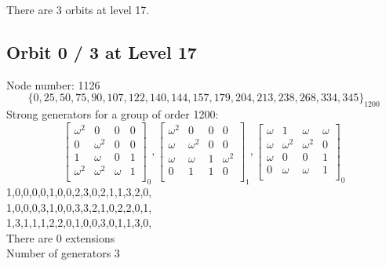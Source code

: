 There are 3 orbits at level 17.\\
\bigskip
\subsection*{Orbit 0 / 3 at Level 17}
Node number: 1126\\
$$
\{ 0, 25, 50, 75, 90, 107, 122, 140, 144, 157, 179, 204, 213, 238, 268, 334, 345 \}_{1200}$$
{\small\arraycolsep=2pt
Strong generators for a group of order 1200:
$$
\left[
\begin{array}{*{4}{r}}
\omega^{2} & 0 & 0 & 0\\
0 & \omega^{2} & 0 & 0\\
1 & \omega  & 0 & 1\\
\omega^{2} & \omega^{2} & \omega  & 1\\
\end{array}
\right]
_{0}
, 
\left[
\begin{array}{*{4}{r}}
\omega^{2} & 0 & 0 & 0\\
\omega  & \omega^{2} & 0 & 0\\
\omega  & \omega  & 1 & \omega^{2}\\
0 & 1 & 1 & 0\\
\end{array}
\right]
_{1}
, 
\left[
\begin{array}{*{4}{r}}
\omega  & 1 & \omega  & \omega \\
\omega  & \omega^{2} & \omega^{2} & 0\\
\omega  & 0 & 0 & 1\\
0 & \omega  & \omega  & 1\\
\end{array}
\right]
_{0}
$$
1,0,0,0,0,1,0,0,2,3,0,2,1,1,3,2,0,\\
1,0,0,0,3,1,0,0,3,3,2,1,0,2,2,0,1,\\
1,3,1,1,1,2,2,0,1,0,0,3,0,1,1,3,0,\\
}
There are 0 extensions\\
Number of generators 3\\
